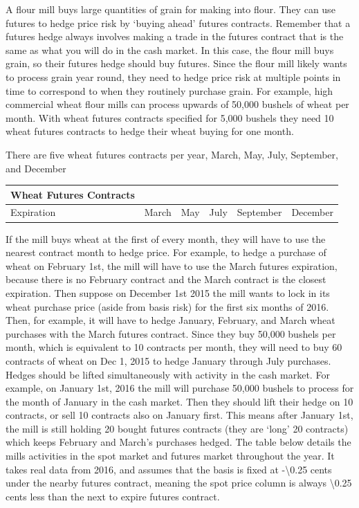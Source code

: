 \documentclass[
]{book}
\begin{document}
A flour mill buys large quantities of grain for making into flour. They can use futures to hedge price risk by `buying ahead' futures contracts. Remember that a futures hedge always involves making a trade in the futures contract that is the same as what you will do in the cash market. In this case, the flour mill buys grain, so their futures hedge should buy futures. Since the flour mill likely wants to process grain year round, they need to hedge price risk at multiple points in time to correspond to when they routinely purchase grain. For example, high commercial wheat flour mills can process upwards of 50,000 bushels of wheat per month. With wheat futures contracts specified for 5,000 bushels they need 10 wheat futures contracts to hedge their wheat buying for one month.

There are five wheat futures contracts per year, March, May, July, September, and December

\begin{longtable}[]{@{}lccccc@{}}
\toprule
Wheat Futures Contracts & & & & &\tabularnewline
\midrule
\endhead
Expiration & March & May & July & September & December\tabularnewline
\bottomrule
\end{longtable}

If the mill buys wheat at the first of every month, they will have to use the nearest contract month to hedge price. For example, to hedge a purchase of wheat on February 1st, the mill will have to use the March futures expiration, because there is no February contract and the March contract is the closest expiration. Then suppose on December 1st 2015 the mill wants to lock in its wheat purchase price (aside from basis risk) for the first six months of 2016. Then, for example, it will have to hedge January, February, and March wheat purchases with the March futures contract. Since they buy 50,000 bushels per month, which is equivalent to 10 contracts per month, they will need to buy 60 contracts of wheat on Dec 1, 2015 to hedge January through July purchases. Hedges should be lifted simultaneously with activity in the cash market. For example, on January 1st, 2016 the mill will purchase 50,000 bushels to process for the month of January in the cash market. Then they should lift their hedge on 10 contracts, or sell 10 contracts also on January first. This means after January 1st, the mill is still holding 20 bought futures contracts (they are `long' 20 contracts) which keeps February and March's purchases hedged. The table below details the mills activities in the spot market and futures market throughout the year. It takes real data from 2016, and assumes that the basis is fixed at -\textbackslash0.25 cents under the nearby futures contract, meaning the spot price column is always \textbackslash0.25 cents less than the next to expire futures contract.
\end{document}

